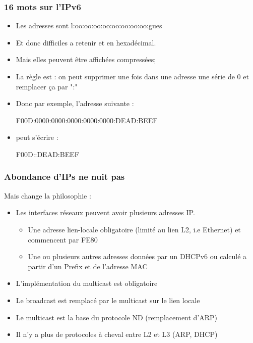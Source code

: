 \documentclass{smilebeamer}
\begin{document}
\begin{frame}[fragile]

\frametitle{16 mots sur l'IPv6}

\begin{itemize}
\item Les adresses sont l:oo:oo:oo:oo:oo:oo:oo:oo:gues
\item Et donc difficiles a retenir et en hexadécimal.
\item Mais elles peuvent être affichées compressées;
\item La règle est : on peut supprimer une fois dans une adresse une série de 0 et remplacer ça par ":"
\item Donc par exemple, l'adresse suivante : 


\begin{consolecode}
F00D:0000:0000:0000:0000:0000:DEAD:BEEF
\end{consolecode}

\item peut s'écrire : 
\begin{consolecode}
F00D::DEAD:BEEF
\end{consolecode}
\end{itemize}
\end{frame}


\begin{frame}
\frametitle{Abondance d'IPs ne nuit pas}

Mais change la philosophie :
\begin{itemize}

\item Les interfaces réseaux peuvent avoir plusieurs adresses IP.
\begin{itemize}
\item Une adresse lien-locale obligatoire (limité au lien L2, i.e
Ethernet) et commencent par FE80
\item Une ou plusieurs autres adresses données par un DHCPv6 ou calculé a partir d'un Prefix et de l'adresse MAC
\end{itemize}

\item L'implémentation du multicast est obligatoire
\item Le broadcast est remplacé par le multicast sur le lien locale
\item Le multicast est la base du protocole ND (remplacement d'ARP)
\item Il n'y a plus de protocoles à cheval entre L2 et L3 (ARP, DHCP)
\end{itemize}

\end{frame}
\end{document}
